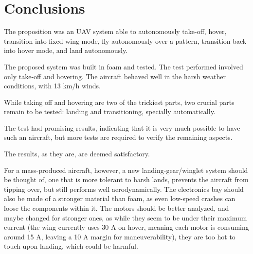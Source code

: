 \chapter{Conclusions} \label{chap:conclusions}

The proposition was an UAV system able to autonomously take-off, hover, transition into fixed-wing mode, fly autonomously over a pattern, transition back into hover mode, and land autonomously.

The proposed system was built in foam and tested.
The test performed involved only take-off and hovering. The aircraft behaved well in the harsh weather conditions, with 13 km/h winds.

While taking off and hovering are two of the trickiest parts, two crucial parts remain to be tested: landing and transitioning, specially automatically.

The test had promising results, indicating that it is very much possible to have such an aircraft, but more tests are required to verify the remaining aspects.

The results, as they are, are deemed satisfactory.

For a mass-produced aircraft, however, a new landing-gear/winglet system should be thought of, one that is more tolerant to harsh lands, prevents the aircraft from tipping over, but still performs well aerodynamically.
The electronics bay should also be made of a stronger material than foam, as even low-speed crashes can loose the components within it.
The motors should be better analyzed, and maybe changed for stronger ones, as while they seem to be under their maximum current (the wing currently uses 30 A on hover, meaning each motor is consuming around 15 A, leaving a 10 A margin for maneuverability), they are too hot to touch upon landing, which could be harmful.